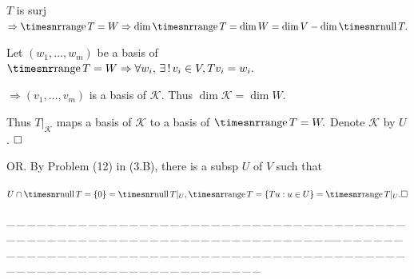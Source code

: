 \documentclass[a4paper, 11pt, UTF8]{article}
\def\range{{\timesnr\textup{range}}\,}
\def\null{{\timesnr\textup{null}}\,}
\def\Or{\large O{\footnotesize R.} }
\def\ProblemEnding{{\tiny \_\,\_\,\_\,\_\,\_\,\_\,\_\,\_\,\_\,\_\,\_\,\_\,\_\,\_\,\_\,\_\,\_\,\_\,\_\,\_\,\_\,\_\,\_\,\_\,\_\,\_\,\_\,\_\,\_\,\_\,\_\,\_\,\_\,\_\,\_\,\_\,\_\,\_\,\_\,\_\,\_\,\_\,\_\,\_\,\_\,\_\,\_\,\_\,\_\,\_\,\_\,\_\,\_\,\_\,\_\,\_\,\_\,\_\,\_\,\_\,\_\,\_\,\_\,\_\,\_\,\_\,\_\,\_\,\_\,\_\,\_\_\,\_\,\_\,\_\,\_\,\_\,\_\,\_\,\_\,\_\,\_\,\_\,\_\,\_\,\_\,\_\,\_\,\_\,\_\,\_\,\_\,\_\,\_\,\_\,\_\,\_\,\_\,\_\,\_\,\_\,\_\,\_\,\_\,\_\,\_\,\_\,\_\,\_\,\_\,\_\,\_\,\_\,\_\,\_\,\_\,\_\,\_\,\_\,\_\,\_\,\_\,\_\,\_\,\_\,\_\,\_\,\_\,\_\,\_\,\_\,\_\,\_\,\_\,\_\,\_\,\_\,\_\,\_\,\_\,\_\,\_}}
\begin{document}
\begin{large}
\par\quad
$T$ is surj $\Rightarrow\range T=W\Rightarrow\dim\range T=\dim W=\dim V-\dim\null T.$\par\quad
Let $(w_1,\dots,w_m)$ be a basis of $\range T=W\Rightarrow\forall w_i,\,\exists\,!\,v_i\in V,Tv_i=w_i.$\par\quad
$\Rightarrow(v_1,\dots,v_m)$ is a basis of $\mathcal{K}$. Thus $\dim\mathcal{K}=\dim W$.\par\quad
Thus $T|_{\mathcal{K}}$ maps a basis of $\mathcal{K}$ to a basis of $\range T=W.$ Denote $\mathcal{K}$ by $U$. $\hfill\square$\par\vspace{6pt}\quad
\Or By Problem (12) in (3.B), there is a subsp $U$ of $V$ such that\par\quad
$U\cap \null T=\{0\}=\null T|_U,\range T=\left\{Tu:u\in U\right\}=\range T|_U.\hfill\square$\par
\ProblemEnding\par


\end{large}
\end{document}
